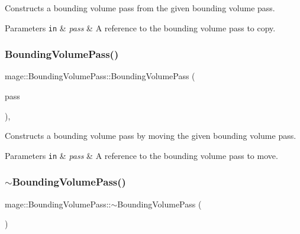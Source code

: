 Constructs a bounding volume pass from the given bounding volume pass.


\begin{DoxyParams}[1]{Parameters}
\mbox{\tt in}  & {\em pass} & A reference to the bounding volume pass to copy. \\
\hline
\end{DoxyParams}
\hypertarget{classmage_1_1_bounding_volume_pass_a1e1431a97fbdb04a793eac7da2fb5612}{}\label{classmage_1_1_bounding_volume_pass_a1e1431a97fbdb04a793eac7da2fb5612} 
\subsubsection{\texorpdfstring{Bounding\+Volume\+Pass()}{BoundingVolumePass()}\hspace{0.1cm}{\footnotesize\ttfamily [3/3]}}
{\footnotesize\ttfamily mage\+::\+Bounding\+Volume\+Pass\+::\+Bounding\+Volume\+Pass (\begin{DoxyParamCaption}\item[{\hyperlink{classmage_1_1_bounding_volume_pass}{Bounding\+Volume\+Pass} \&\&}]{pass }\end{DoxyParamCaption})\hspace{0.3cm}{\ttfamily [default]}, {\ttfamily [noexcept]}}

Constructs a bounding volume pass by moving the given bounding volume pass.


\begin{DoxyParams}[1]{Parameters}
\mbox{\tt in}  & {\em pass} & A reference to the bounding volume pass to move. \\
\hline
\end{DoxyParams}
\hypertarget{classmage_1_1_bounding_volume_pass_a41dc433aed26f05e8b60462a6e337509}{}\label{classmage_1_1_bounding_volume_pass_a41dc433aed26f05e8b60462a6e337509} 
\subsubsection{\texorpdfstring{$\sim$\+Bounding\+Volume\+Pass()}{~BoundingVolumePass()}}
{\footnotesize\ttfamily mage\+::\+Bounding\+Volume\+Pass\+::$\sim$\+Bounding\+Volume\+Pass (\begin{DoxyParamCaption}{ }\end{DoxyParamCaption})\hspace{0.3cm}{\ttfamily [default]}}

